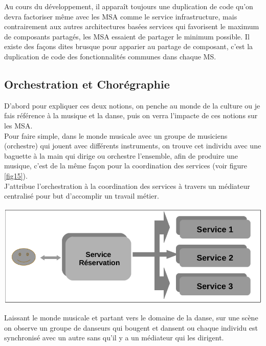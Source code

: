 \documentclass[12pt, a4paper, openany]{report}
\begin{document}
   Au cours du développement, il apparaît toujours une duplication de code qu'on devra factoriser même avec les MSA comme le service infrastructure, mais contrairement aux autres architectures basées services qui favorisent le maximum de composants partagés, les MSA essaient de partager le minimum possible. Il existe des façons dites brusque pour apparier au partage de composant, c'est la duplication de code des fonctionnalités communes dans chaque MS.\\
   
   
   \subsection{Orchestration et Chorégraphie}
   
    D'abord pour expliquer ces deux notions, on penche au monde de la culture ou je fais référence à la musique et la danse, puis on verra l'impacte de ces notions sur les MSA.\\
    
    Pour faire simple, dans le monde musicale avec un groupe de musiciens (orchestre) qui jouent avec différents instruments, on trouve cet individu avec une baguette à la main qui dirige ou orchestre l'ensemble, afin de produire une musique, c'est de la même façon pour la coordination des services (voir figure \ref{fig15}).\\
     
    J'attribue l'orchestration à la coordination des services à travers un médiateur centralisé pour but d'accomplir un travail métier. \\
     
    \begin{center}
      \includegraphics[scale=0.3]{service_orchestra_15.png}
      \label{fig15}
    \end{center}
    
    Laissant le monde musicale et partant vers le domaine de la danse, sur une scène on observe un groupe de danseurs qui bougent et dansent ou chaque individu est synchronisé avec un autre sans qu'il y a un médiateur qui les dirigent.\\
    
\end{document}

